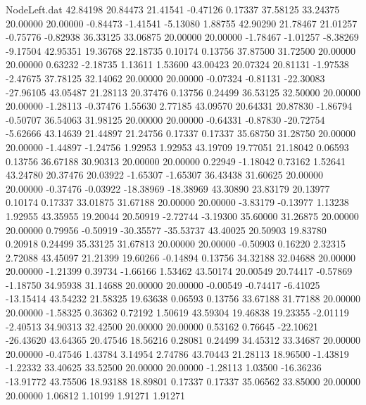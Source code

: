 \begin{filecontents}{NodeLeft.dat}
  42.84198   20.84473   21.41541    -0.47126    0.17337   37.58125   33.24375   20.00000   20.00000   -0.84473   -1.41541   -5.13080    1.88755
  42.90290   21.78467   21.01257    -0.75776   -0.82938   36.33125   33.06875   20.00000   20.00000   -1.78467   -1.01257   -8.38269   -9.17504
  42.95351   19.36768   22.18735     0.10174    0.13756   37.87500   31.72500   20.00000   20.00000    0.63232   -2.18735    1.13611    1.53600
  43.00423   20.07324   20.81131    -1.97538   -2.47675   37.78125   32.14062   20.00000   20.00000   -0.07324   -0.81131  -22.30083  -27.96105
  43.05487   21.28113   20.37476     0.13756    0.24499   36.53125   32.50000   20.00000   20.00000   -1.28113   -0.37476    1.55630    2.77185
  43.09570   20.64331   20.87830    -1.86794   -0.50707   36.54063   31.98125   20.00000   20.00000   -0.64331   -0.87830  -20.72754   -5.62666
  43.14639   21.44897   21.24756     0.17337    0.17337   35.68750   31.28750   20.00000   20.00000   -1.44897   -1.24756    1.92953    1.92953
  43.19709   19.77051   21.18042     0.06593    0.13756   36.67188   30.90313   20.00000   20.00000    0.22949   -1.18042    0.73162    1.52641
  43.24780   20.37476   20.03922    -1.65307   -1.65307   36.43438   31.60625   20.00000   20.00000   -0.37476   -0.03922  -18.38969  -18.38969
  43.30890   23.83179   20.13977     0.10174    0.17337   33.01875   31.67188   20.00000   20.00000   -3.83179   -0.13977    1.13238    1.92955
  43.35955   19.20044   20.50919    -2.72744   -3.19300   35.60000   31.26875   20.00000   20.00000    0.79956   -0.50919  -30.35577  -35.53737
  43.40025   20.50903   19.83780     0.20918    0.24499   35.33125   31.67813   20.00000   20.00000   -0.50903    0.16220    2.32315    2.72088
  43.45097   21.21399   19.60266    -0.14894    0.13756   34.32188   32.04688   20.00000   20.00000   -1.21399    0.39734   -1.66166    1.53462
  43.50174   20.00549   20.74417    -0.57869   -1.18750   34.95938   31.14688   20.00000   20.00000   -0.00549   -0.74417   -6.41025  -13.15414
  43.54232   21.58325   19.63638     0.06593    0.13756   33.67188   31.77188   20.00000   20.00000   -1.58325    0.36362    0.72192    1.50619
  43.59304   19.46838   19.23355    -2.01119   -2.40513   34.90313   32.42500   20.00000   20.00000    0.53162    0.76645  -22.10621  -26.43620
  43.64365   20.47546   18.56216     0.28081    0.24499   34.45312   33.34687   20.00000   20.00000   -0.47546    1.43784    3.14954    2.74786
  43.70443   21.28113   18.96500    -1.43819   -1.22332   33.40625   33.52500   20.00000   20.00000   -1.28113    1.03500  -16.36236  -13.91772
  43.75506   18.93188   18.89801     0.17337    0.17337   35.06562   33.85000   20.00000   20.00000    1.06812    1.10199    1.91271    1.91271

\end{filecontents}
